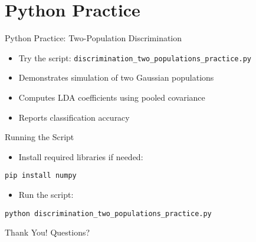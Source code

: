 \documentclass[aspectratio=169]{beamer}
\begin{document}
\section{Python Practice}
\begin{frame}{Python Practice: Two-Population Discrimination}
  \begin{itemize}
    \item Try the script: \texttt{discrimination\_two\_populations\_practice.py}
    \item Demonstrates simulation of two Gaussian populations
    \item Computes LDA coefficients using pooled covariance
    \item Reports classification accuracy
  \end{itemize}
\end{frame}

\begin{frame}[fragile]{Running the Script}
  \begin{itemize}
    \item Install required libraries if needed:
  \end{itemize}
  \vspace{0.5cm}
  \begin{verbatim}
pip install numpy
  \end{verbatim}
  \vspace{0.5cm}
  \begin{itemize}
    \item Run the script:
  \end{itemize}
  \vspace{0.5cm}
  \begin{verbatim}
python discrimination_two_populations_practice.py
  \end{verbatim}
\end{frame}

\begin{frame}
  \centering
  \Huge Thank You!
  \vspace{1cm}
  \normalsize Questions?
\end{frame}
\end{document}

